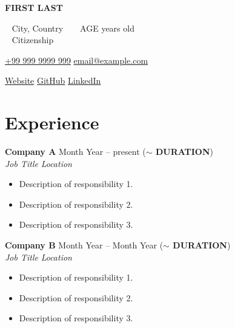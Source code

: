 \documentclass[a4paper,10pt]{article}
\newcommand{\entry}[4]{
  \noindent\textbf{#1} \hfill #2 \\
  \noindent\textit{#3} \hfill \textit{#4} \\
  \vspace{2pt}
}
\begin{document}

\noindent
\begin{minipage}[t]{0.5\textwidth}
\textbf{\Large FIRST LAST}

\vspace{0.4em}

\noindent \faMapMarker ~ City, Country ~ \faUser ~ AGE years old \\
\faIdCard ~ Citizenship
\end{minipage}%
\begin{minipage}[t]{0.5\textwidth}
\raggedleft
{\color{blue}} \href{https://example.com}{\faPhone \space +99 999 9999 999} \quad
{\color{blue}} \href{mailto:email@example.com}{\faEnvelope \space email@example.com}

\vspace{0.2em}

{\color{blue}} \href{https://website.com}{\faGlobe \space Website} \quad
{\color{blue}} \href{https://github.com/username}{\faGithub \space GitHub} \quad
{\color{blue}} \href{https://linkedin.com/in/username}{\faLinkedin \space LinkedIn} \\
\end{minipage}

\vspace{0.5em}

\section*{Experience}
\vspace{0.6em}
\entry{Company A}{\faCalendar \space Month Year -- present (\textbf{$\sim$ DURATION})}{Job Title}{\faMapMarker \space Location}
\vspace{-1.6em}
\begin{itemize}
\setlength\itemsep{-0.3em}
\item Description of responsibility 1.
\item Description of responsibility 2.
\item Description of responsibility 3.
\end{itemize}

\entry{Company B}{\faCalendar \space Month Year -- Month Year (\textbf{$\sim$ DURATION})}{Job Title}{\faMapMarker \space Location}
\vspace{-1.6em}
\begin{itemize}
\setlength\itemsep{-0.3em}
\item Description of responsibility 1.
\item Description of responsibility 2.
\item Description of responsibility 3.
\end{itemize}
\end{document}
